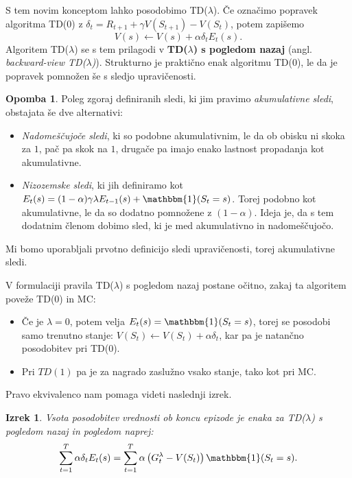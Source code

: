 \documentclass[12pt,a4paper]{amsart}
\theoremstyle{definition} %
\newtheorem{opomba}[definicija]{Opomba}
\theoremstyle{plain} %
\newtheorem{izrek}[definicija]{Izrek}
\begin{document}
S tem novim konceptom lahko posodobimo TD($\lambda$). Če označimo popravek algoritma TD($0$) z 
$\delta_t = R_{t+1} + \gamma V(S_{t+1}) - V(S_t)$, potem zapišemo
\begin{equation}\label{TDlambda}
    V(s) \leftarrow V(s) + \alpha \delta_t E_t(s).
\end{equation}
Algoritem TD($\lambda$) se s tem prilagodi v \textbf{TD($\lambda$) s pogledom nazaj} (angl. 
\textit{backward-view TD($\lambda$)}). Strukturno je praktično enak algoritmu TD($0$), le da je 
popravek pomnožen še s sledjo upravičenosti.

\begin{opomba}
    Poleg zgoraj definiranih sledi, ki jim pravimo \textit{akumulativne sledi}, obstajata še dve 
    alternativi:
    \begin{itemize}
        \item \textit{Nadomeščujoče sledi}, ki so podobne akumulativnim, le da ob obisku ni skoka za 
                $1$, pač pa skok na $1$, drugače pa imajo enako lastnost propadanja kot akumulativne. 
        \item \textit{Nizozemske sledi}, ki jih definiramo kot $E_t(s) = (1 - \alpha) \gamma \lambda 
                E_{t-1}(s) + \mathbbm{1}(S_t = s)$. Torej podobno kot akumulativne, le da so dodatno 
                pomnožene z $(1 - \alpha)$. Ideja je, da s tem dodatnim členom dobimo sled, ki je med 
                akumulativno in nadomeščujočo.
    \end{itemize}
    Mi bomo uporabljali prvotno definicijo sledi upravičenosti, torej akumulativne sledi. 
\end{opomba}

V formulaciji pravila TD($\lambda$) s pogledom nazaj postane očitno, zakaj ta algoritem poveže TD($0$) 
in MC:

\begin{itemize}
    \item Če je $\lambda = 0$, potem velja $E_t(s) = \mathbbm{1}(S_t = s)$, torej se posodobi samo
            trenutno stanje: $V(S_t) \leftarrow V(S_t) + \alpha \delta_t$, kar pa je natančno 
            posodobitev pri TD($0$).
    \item Pri $TD(1)$ pa je za nagrado zaslužno vsako stanje, tako kot pri MC. 
\end{itemize}
Pravo ekvivalenco nam pomaga videti naslednji izrek.

\begin{izrek}
    Vsota posodobitev vrednosti ob koncu epizode je enaka za TD($\lambda$) s pogledom nazaj in 
    pogledom naprej:
    $$
    \sum_{t=1}^T \alpha \delta_t E_t(s) = \sum_{t=1}^T \alpha \left( G_t^\lambda - V(S_t) \right) 
    \mathbbm{1}(S_t = s).
    $$
\end{izrek}
\end{document}
